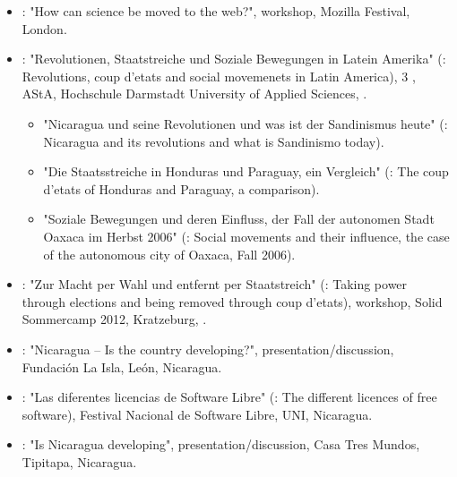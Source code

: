 \begin{itemize}
\item {}: "How can science be moved to the web?", workshop, Mozilla Festival, London.

\item {}: "Revolutionen, Staatstreiche und Soziale Bewegungen in Latein Amerika" (\english: Revolutions, coup d'etats and social movemenets in Latin America), 3 \days \series, AStA, Hochschule Darmstadt University of Applied Sciences, \Germany.
	\begin{itemize}
	\item "Nicaragua und seine Revolutionen und was ist der Sandinismus heute" (\english: Nicaragua and its revolutions and what is Sandinismo today).
	\item "Die Staatsstreiche in Honduras und Paraguay, ein Vergleich" (\english: The coup d'etats of Honduras and Paraguay, a comparison).
	\item "Soziale Bewegungen und deren Einfluss, der Fall der autonomen Stadt Oaxaca im Herbst 2006" (\english: Social movements and their influence, the case of the autonomous city of Oaxaca, Fall 2006).
	\end{itemize}


\item {}: "Zur Macht per Wahl und entfernt per Staatstreich" (\english: Taking power through elections and being removed through coup d'etats), workshop, Solid Sommercamp 2012, Kratzeburg, \Germany.

\item {}: "Nicaragua – Is the country developing?", presentation/discussion, Fundación La Isla, León, Nicaragua.

\item {}: "Las diferentes licencias de Software Libre" (\english: The different licences of free software), Festival Nacional de Software Libre, UNI, Nicaragua.

\item {}: "Is Nicaragua developing", presentation/discussion, Casa Tres Mundos, Tipitapa, Nicaragua.


\end{itemize}
